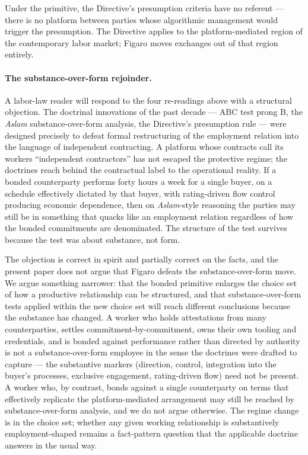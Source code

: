 \documentclass[11pt,a4paper]{article}
\theoremstyle{remark}
\begin{document}
Under the primitive, the Directive's presumption criteria have no
referent --- there is no platform between parties whose algorithmic
management would trigger the presumption. The Directive applies to
the platform-mediated region of the contemporary labor market;
Figaro moves exchanges out of that region entirely.

\paragraph{The substance-over-form rejoinder.}
A labor-law reader will respond to the four re-readings above with
a structural objection. The doctrinal innovations of the past
decade --- ABC test prong B, the \emph{Aslam} substance-over-form
analysis, the Directive's presumption rule --- were designed
precisely to defeat formal restructuring of the employment relation
into the language of independent contracting. A platform whose
contracts call its workers ``independent contractors'' has not
escaped the protective regime; the doctrines reach behind the
contractual label to the operational reality. If a bonded
counterparty performs forty hours a week for a single buyer, on a
schedule effectively dictated by that buyer, with rating-driven
flow control producing economic dependence, then on
\emph{Aslam}-style reasoning the parties may still be in something
that quacks like an employment relation regardless of how the
bonded commitments are denominated. The structure of the test
survives because the test was about substance, not form.

The objection is correct in spirit and partially correct on the
facts, and the present paper does not argue that Figaro defeats
the substance-over-form move. We argue something narrower: that
the bonded primitive enlarges the choice set of how a productive
relationship can be structured, and that substance-over-form
tests applied within the new choice set will reach different
conclusions because the substance has changed. A worker who
holds attestations from many counterparties, settles
commitment-by-commitment, owns their own tooling and credentials,
and is bonded against performance rather than directed by
authority is not a substance-over-form employee in the sense the
doctrines were drafted to capture --- the substantive markers
(direction, control, integration into the buyer's processes,
exclusive engagement, rating-driven flow) need not be present.
A worker who, by contrast, bonds against a single counterparty
on terms that effectively replicate the platform-mediated
arrangement may still be reached by substance-over-form analysis,
and we do not argue otherwise. The regime change is in the choice
set; whether any given working relationship is substantively
employment-shaped remains a fact-pattern question that the
applicable doctrine answers in the usual way.
\end{document}
